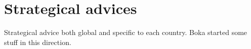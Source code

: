 
\chapter{Strategical advices}\label{chapter:Strategy}

\begin{todo}
  Strategical advice both global and specific to each country. Boka started
  some stuff in this direction.
\end{todo}

